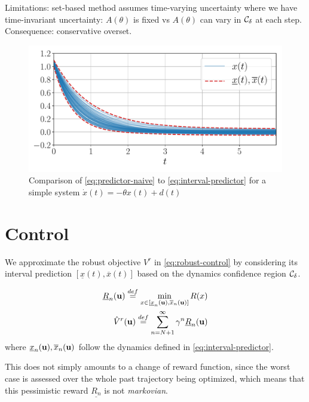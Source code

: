 \documentclass{article}
\begin{document}
Limitations: set-based method assumes time-varying uncertainty where we have time-invariant uncertainty: $A(\theta)$ is fixed vs $A(\theta)$ can vary in $\mathcal{C}_\delta$ at each step. Consequence: conservative overset.
\begin{figure}[tp]
	\centering
	\includegraphics[width=\linewidth]{img/interval-predictor}
	\caption{Comparison of \eqref{eq:predictor-naive} to \eqref{eq:interval-predictor} for a simple system $\dot{x}(t)=-\theta x(t)+d(t)$}
	\label{fig:predictor_example}
\end{figure}

\section{Control}

\label{sec:control}
We approximate the robust objective $V^r$ in \eqref{eq:robust-control} by considering its interval prediction $[\underline{x}(t), \overline{x}(t)]$ based on the dynamics confidence region $\mathcal{C}_\delta$.

\begin{definition}
\begin{align}
\underline{R}_n(\mathbf{u}) \stackrel{def}{=} \min_{x\in[\underline{x}_n(\mathbf{u}), \overline{x}_n(\mathbf{u})]}  R(x) \label{eq:pessimistic-rewards} \\
\hat{V}^r(\mathbf{u}) \stackrel{def}{=} \sum_{n=N+1}^\infty \gamma^n \underline{R}_n(\mathbf{u}) \label{eq:surrogate_objective}
\end{align}
where $\underline{x}_n(\mathbf{u}), \overline{x}_n(\mathbf{u})$ follow the dynamics defined in \eqref{eq:interval-predictor}.
\end{definition}

This does not simply amounts to a change of reward function, since the worst case is assessed over the whole past trajectory being optimized, which means that this pessimistic reward $\underline{R_n}$ is not \emph{markovian}.
\end{document}
